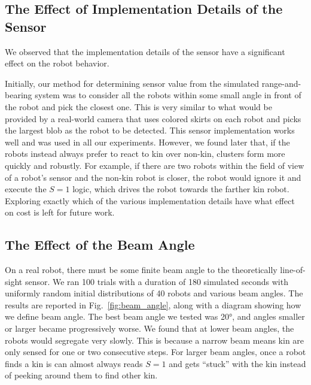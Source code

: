 \documentclass[letterpaper, 10 pt, conference]{ieeeconf}
\begin{document}
\subsection{The Effect of Implementation Details of the Sensor} \label{section:sensor_impl}

We observed that the implementation details of the sensor have a significant
effect on the robot behavior.

Initially, our method for determining sensor value from the simulated
range-and-bearing system was to consider all the robots within some small angle
in front of the robot and pick the closest one. This is very similar to what
would be provided by a real-world camera that uses colored skirts on each robot
and picks the largest blob as the robot to be detected. This sensor
implementation works well and was used in all our experiments. However, we found
later that, if the robots instead always prefer to react to kin over non-kin,
clusters form more quickly and robustly. For example, if there are two robots
within the field of view of a robot's sensor and the non-kin robot is closer,
the robot would ignore it and execute the $S=1$ logic, which drives the robot
towards the farther kin robot. Exploring exactly which of the various
implementation details have what effect on cost is left for future work.

\subsection{The Effect of the Beam Angle} \label{sec:aperture_angle}

On a real robot, there must be some finite beam angle to the theoretically
line-of-sight sensor. We ran 100 trials with a duration of 180 simulated seconds
with uniformly random initial distributions of 40 robots and various beam
angles. The results are reported in Fig.~\ref{fig:beam_angle}, along with a
diagram showing how we define beam angle. The best beam angle we tested was
\ang{20}, and angles smaller or larger became progressively worse. We found that
at lower beam angles, the robots would segregate very slowly. This is because a narrow beam
means kin are only sensed for one or two consecutive steps.
For larger beam angles, once a robot finds a kin is can almost always reads $S=1$
and gets ``stuck'' with the kin instead of peeking around them to find other kin.
\end{document}
